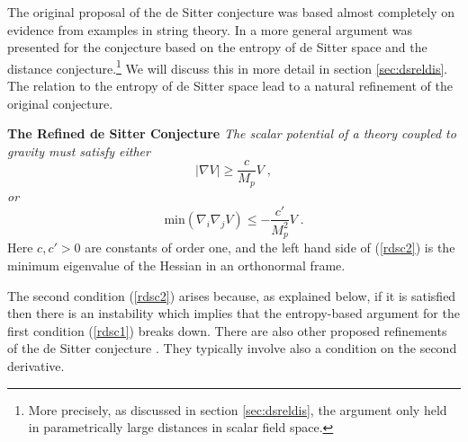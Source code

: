 \documentclass[11pt,a4paper]{article}
\numberwithin{equation}{section}
\numberwithin{table}{section}\setlength{\multlinegap}{25pt}
\begin{document}
{The original proposal of the de Sitter conjecture \cite{Obied:2018sgi} was based almost completely on evidence from examples in string theory. In \cite{Ooguri:2018wrx} a more general argument was presented for the conjecture based on the entropy of de Sitter space and the distance conjecture.\footnote{More precisely, as discussed in section \ref{sec:dsreldis}, the argument only held in parametrically large distances in scalar field space.} We will discuss this in more detail in section \ref{sec:dsreldis}. The relation to the entropy of de Sitter space lead to a natural refinement of the original conjecture. 
\begin{tcolorbox}
{\bf The Refined de Sitter Conjecture} \;\cite{Ooguri:2018wrx,Garg:2018reu} 
{\it 
\newline
\newline
The scalar potential of a theory coupled to gravity must satisfy either 
\begin{equation}
\label{rdsc1}
\left|\nabla V \right| \geq \frac{c}{M_p} V\;,
\end{equation}
or
\begin{equation}
\label{rdsc2}
\mathrm{min}\left(\nabla_i \nabla_j V \right) \leq -\frac{c'}{M^2_p} V\;.
\end{equation}
}
Here $c,c'>0$ are constants of order one, and the left hand side of (\ref{rdsc2}) is the minimum eigenvalue of the Hessian in an orthonormal frame.
\end{tcolorbox}
The second condition (\ref{rdsc2}) arises because, as explained below, if it is satisfied then there is an instability which implies that the entropy-based argument for the first condition (\ref{rdsc1}) breaks down. There are also other proposed refinements of the de Sitter conjecture \cite{Andriot:2018wzk,Garg:2018reu,Ben-Dayan:2018mhe,Dvali:2018jhn,Garg:2018zdg,Andriot:2018mav}.%
They typically involve also a condition on the second derivative. 

}
\end{document}
